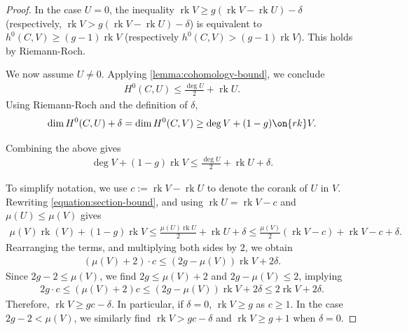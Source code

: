 \documentclass[12 pt]{amsart}
\theoremstyle{plain}
\theoremstyle{definition}
\theoremstyle{remark}
\numberwithin{equation}{section}
\DeclareMathOperator\rk{rk}
\begin{document}
\begin{proof}
	In the case $U = 0$, the inequality 
	$\rk V \geq g (\rk V - \rk U)-\delta$ (respectively, $\rk V> g (\rk V - \rk
	U)-\delta$)
	is equivalent to
	$h^0(C, V) \geq (g-1) \rk V$ (respectively $h^0(C, V) > (g-1) \rk V$).
	This holds by Riemann-Roch.

	We now assume $U \neq 0$.
	Applying \autoref{lemma:cohomology-bound}, we conclude
	\begin{align*}
	H^0(C,U) \leq \frac{\deg
	U}{2} + \rk U.
	\end{align*}
	Using Riemann-Roch and the definition of $\delta$,
	\begin{align*}
	\dim H^0(C,U) + \delta = \dim H^0(C, V) \geq \deg V + (1-g)
	\on{rk}
	V.
	\end{align*}

	Combining the above gives
	\begin{align}
		\label{equation:section-bound}
		\deg V + (1-g) \rk V \leq \frac{\deg U}{2} + \rk U + \delta.
	\end{align}

	To simplify notation, we use $c := \rk V - \rk U$ to denote the corank
	of $U$ in $V$.
	Rewriting \eqref{equation:section-bound}, and using $\rk U = \rk V - c$ and $\mu(U) \leq
	\mu(V)$ gives
	\begin{align*}
		\mu(V) \rk (V) + (1-g) \rk V \leq \frac{\mu(U) \rk U}{2} + \rk U
		+ \delta
		\leq \frac{\mu(V)}{2} (\rk V - c) + \rk V - c + \delta.
	\end{align*}
	Rearranging the terms,
	and multiplying both sides by $2$, we obtain
	\begin{align*}
		(\mu(V)+2) \cdot c \leq (2g-\mu(V)) \rk V + 2 \delta.
	\end{align*}
	Since $2g-2 \leq \mu(V)$, we find 
	$2g \leq \mu(V) + 2$ and $2g - \mu(V) \leq 2$, implying
	\begin{align*}
		2g \cdot c \leq (\mu(V) + 2)c \leq (2g-\mu(V)) \rk V +2\delta
		\leq 2 \rk V +2\delta.
	\end{align*}
	Therefore, $\rk V \geq gc - \delta$. 
	In particular, if $\delta =0$, $\rk V \geq g$ as $c \geq 1$.
	In the case $2g-2 < \mu(V)$, we similarly find $\rk V > gc - \delta$
	and $\rk V \geq g + 1$ when $\delta = 0$.
\end{proof}
\end{document}
